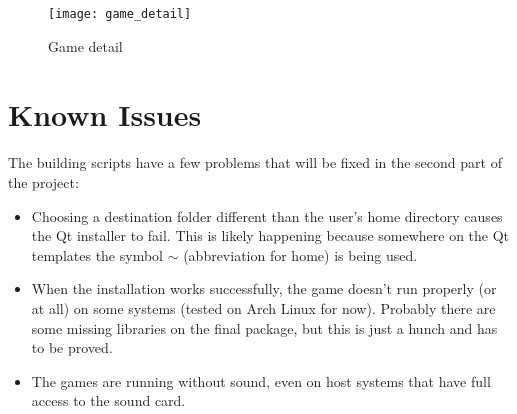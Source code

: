 

\begin{figure}[h!]
\centering
\texttt{[image: game\_detail]}
\caption{Game detail}
\label{fig:game_detail}
\end{figure}

\section{Known Issues}
\label {sec:issues}

The building scripts have a few problems that will be fixed in the second part of the project:

\begin{itemize}
\item Choosing a destination folder different than the user's home directory causes the Qt installer to fail. This is likely happening because somewhere on the Qt templates the symbol $\sim$ (abbreviation for home) is being used.

\item When the installation works successfully, the game doesn't run properly (or at all) on some systems (tested on Arch Linux for now). Probably there are some missing libraries on the final package, but this is just a hunch and has to be proved.

\item The games are running without sound, even on host systems that have full access to the sound card.
\end{itemize}
